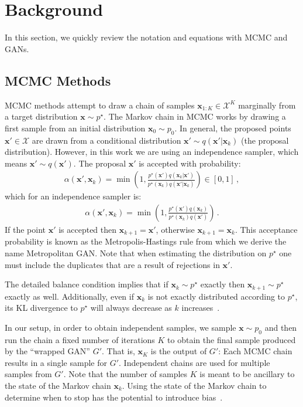 \documentclass{article}
\renewcommand{\vec}[1]{{\boldsymbol{\mathbf{#1}}}} %
\newcommand{\set}[1]{\mathcal{#1}}
\newcommand{\sample}{\sim}
\newcommand{\given}{|}
\newcommand{\target}{{p^\star}}
\newcommand{\prop}{q}
\newcommand{\pinit}{{p_0}}
\newcommand{\accept}{\alpha}
\newcommand{\setx}{\set{X}}
\begin{document}
\section{Background}
\label{sec:Background}

In this section, we quickly review the notation and equations with MCMC and GANs.

\subsection{MCMC Methods}
\label{sec:MCMC Methods}

MCMC methods attempt to draw a chain of samples $\vec x_{1:K} \in \setx^K$ marginally from a target distribution $\vec x \sample \target$.
The Markov chain in MCMC works by drawing a first sample from an initial distribution $\vec x_0 \sample \pinit$.
In general, the proposed points $\vec x' \in \setx$ are drawn from a conditional distribution $\vec x' \sample \prop(\vec x' \given \vec x_k)$ (the proposal distribution)\@.
However, in this work we are using an independence sampler, which means $\vec x' \sample \prop(\vec x')$.
The proposal $\vec x'$ is accepted with probability:
\begin{align}
  \accept(\vec x', \vec x_k) = \min\left(1, \frac{\target(\vec x')\prop(\vec x_k \given \vec x')}{\target(\vec x_k)\prop(\vec x' \given \vec x_k)}\right) \in [0,1]\,,
\end{align}
which for an independence sampler is:
\begin{align}
  \accept(\vec x', \vec x_k) = \min\left(1, \frac{\target(\vec x')\prop(\vec x_k)}{\target(\vec x_k)\prop(\vec x')}\right)\,.
\end{align}
If the point $\vec x'$ is accepted then $\vec x_{k+1} = \vec x'$, otherwise $\vec x_{k+1} = \vec x_k$.
This acceptance probability is known as the Metropolis-Hastings rule from which we derive the name Metropolitan GAN\@.
Note that when estimating the distribution on $\target$ one must include the duplicates that are a result of rejections in $\vec x'$.

The detailed balance condition implies that if $\vec x_k \sample \target$ exactly then $\vec x_{k+1} \sample \target$ exactly as well.
Additionally, even if $\vec x_k$ is not exactly distributed according to $\target$, its KL divergence to $\target$ will always decrease as $k$ increases~\citep{Murray2008,Cover2012}.

In our setup, in order to obtain independent samples, we sample $\vec x \sample \pinit$ and then run the chain a fixed number of iterations $K$ to obtain the final sample produced by the ``wrapped GAN'' $G'$.
That is, $\vec x_K$ is the output of $G'$: Each MCMC chain results in a single sample for $G'$.
Independent chains are used for multiple samples from $G'$.
Note that the number of samples $K$ is meant to be ancillary to the state of the Markov chain $\vec x_k$.
Using the state of the Markov chain to determine when to stop has the potential to introduce bias~\citep{Cowles1999}.
\end{document}
